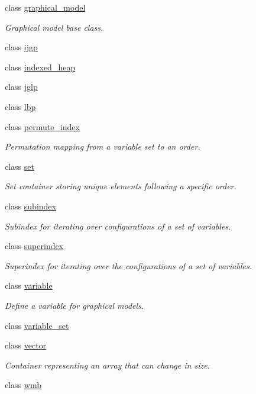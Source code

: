 \begin{DoxyCompactItemize}
class \hyperlink{classmerlin_1_1graphical__model}{graphical\+\_\+model}
\begin{DoxyCompactList}\small\item\em Graphical model base class. \end{DoxyCompactList}\item 
class \hyperlink{classmerlin_1_1ijgp}{ijgp}
\item 
class \hyperlink{classmerlin_1_1indexed__heap}{indexed\+\_\+heap}
\item 
class \hyperlink{classmerlin_1_1jglp}{jglp}
\item 
class \hyperlink{classmerlin_1_1lbp}{lbp}
\item 
class \hyperlink{classmerlin_1_1permute__index}{permute\+\_\+index}
\begin{DoxyCompactList}\small\item\em Permutation mapping from a variable set to an order. \end{DoxyCompactList}\item 
class \hyperlink{classmerlin_1_1set}{set}
\begin{DoxyCompactList}\small\item\em Set container storing unique elements following a specific order. \end{DoxyCompactList}\item 
class \hyperlink{classmerlin_1_1subindex}{subindex}
\begin{DoxyCompactList}\small\item\em Subindex for iterating over configurations of a set of variables. \end{DoxyCompactList}\item 
class \hyperlink{classmerlin_1_1superindex}{superindex}
\begin{DoxyCompactList}\small\item\em Superindex for iterating over the configurations of a set of variables. \end{DoxyCompactList}\item 
class \hyperlink{classmerlin_1_1variable}{variable}
\begin{DoxyCompactList}\small\item\em Define a variable for graphical models. \end{DoxyCompactList}\item 
class \hyperlink{classmerlin_1_1variable__set}{variable\+\_\+set}
\item 
class \hyperlink{classmerlin_1_1vector}{vector}
\begin{DoxyCompactList}\small\item\em Container representing an array that can change in size. \end{DoxyCompactList}\item 
class \hyperlink{classmerlin_1_1wmb}{wmb}
\end{DoxyCompactItemize}
